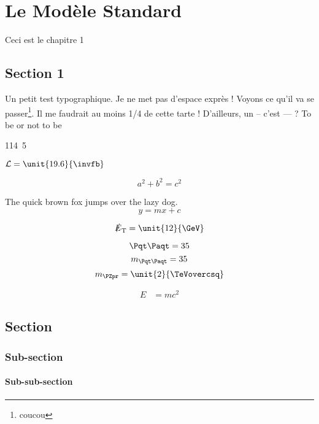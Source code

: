 \chapter{Le Modèle Standard}

Ceci est le chapitre 1

\section{Section 1}

Un petit test typographique. Je ne met pas d'espace exprès ! Voyons ce qu'il va se passer\footnote{coucou}. Il me faudrait au moins 1/4 de cette tarte ! D'ailleurs, un -- c'est --- ? To be or not to be \citep{Beneke:1997hv}

\unit{114.5}{\GeVoverc}

$\lumi = \unit{19.6}{\invfb}$

$$a^2 + b^2 = c^2$$

The quick brown fox jumps over the lazy dog.
\[ y = mx + c \]

$$ \MET = \unit{12}{\GeV} $$

$$ \ttbar = 35$$
$$ \mtt = 35$$
$$ \mzp = \unit{2}{\TeVcc} $$

\begin{align}
  E &= m c^2
\end{align}

\section{Section}
\subsection{Sub-section}
\subsubsection{Sub-sub-section}
